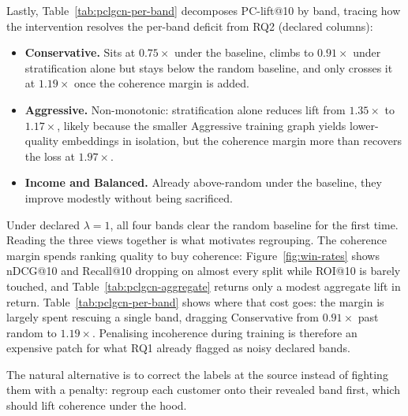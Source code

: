 Lastly, Table~\ref{tab:pclgcn-per-band} decomposes PC-lift@10 by band, tracing how the intervention resolves the per-band deficit from RQ2 (declared columns):
\begin{itemize}
    \item \textbf{Conservative.} Sits at $0.75\times$ under the baseline, climbs to $0.91\times$ under stratification alone but stays below the random baseline, and only crosses it at $1.19\times$ once the coherence margin is added.
    \item \textbf{Aggressive.} Non-monotonic: stratification alone reduces lift from $1.35\times$ to $1.17\times$, likely because the smaller Aggressive training graph yields lower-quality embeddings in isolation, but the coherence margin more than recovers the loss at $1.97\times$.
    \item \textbf{Income and Balanced.} Already above-random under the baseline, they improve modestly without being sacrificed.
\end{itemize}
Under declared $\lambda = 1$, all four bands clear the random baseline for the first time. Reading the three views together is what motivates regrouping. The coherence margin spends ranking quality to buy coherence: Figure~\ref{fig:win-rates} shows nDCG@10 and Recall@10 dropping on almost every split while ROI@10 is barely touched, and Table~\ref{tab:pclgcn-aggregate} returns only a modest aggregate lift in return. Table~\ref{tab:pclgcn-per-band} shows where that cost goes: the margin is largely spent rescuing a single band, dragging Conservative from $0.91\times$ past random to $1.19\times$. Penalising incoherence during training is therefore an expensive patch for what RQ1 already flagged as noisy declared bands.

The natural alternative is to correct the labels at the source instead of fighting them with a penalty: regroup each customer onto their revealed band first, which should lift coherence under the hood.

